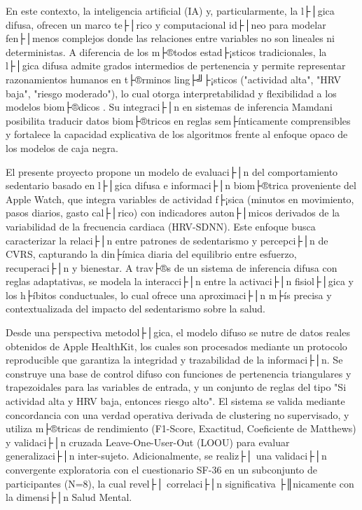 En este contexto, la inteligencia artificial (IA) y, particularmente, la l├│gica difusa, ofrecen un marco te├│rico y computacional id├│neo para modelar fen├│menos complejos donde las relaciones entre variables no son lineales ni deterministas. A diferencia de los m├®todos estad├¡sticos tradicionales, la l├│gica difusa admite grados intermedios de pertenencia y permite representar razonamientos humanos en t├®rminos ling├╝├¡sticos ("actividad alta", "HRV baja", "riesgo moderado"), lo cual otorga interpretabilidad y flexibilidad a los modelos biom├®dicos \cite{Zadeh1965,Ross2010,Kaur2022}. Su integraci├│n en sistemas de inferencia Mamdani posibilita traducir datos biom├®tricos en reglas sem├ínticamente comprensibles y fortalece la capacidad explicativa de los algoritmos frente al enfoque opaco de los modelos de caja negra.

El presente proyecto propone un modelo de evaluaci├│n del comportamiento sedentario basado en l├│gica difusa e informaci├│n biom├®trica proveniente del Apple Watch, que integra variables de actividad f├¡sica (minutos en movimiento, pasos diarios, gasto cal├│rico) con indicadores auton├│micos derivados de la variabilidad de la frecuencia cardiaca (HRV-SDNN). Este enfoque busca caracterizar la relaci├│n entre patrones de sedentarismo y percepci├│n de CVRS, capturando la din├ímica diaria del equilibrio entre esfuerzo, recuperaci├│n y bienestar. A trav├®s de un sistema de inferencia difusa con reglas adaptativas, se modela la interacci├│n entre la activaci├│n fisiol├│gica y los h├íbitos conductuales, lo cual ofrece una aproximaci├│n m├ís precisa y contextualizada del impacto del sedentarismo sobre la salud.

Desde una perspectiva metodol├│gica, el modelo difuso se nutre de datos reales obtenidos de Apple HealthKit, los cuales son procesados mediante un protocolo reproducible que garantiza la integridad y trazabilidad de la informaci├│n. Se construye una base de control difuso con funciones de pertenencia triangulares y trapezoidales para las variables de entrada, y un conjunto de reglas del tipo "Si actividad alta y HRV baja, entonces riesgo alto". El sistema se valida mediante concordancia con una verdad operativa derivada de clustering no supervisado, y utiliza m├®tricas de rendimiento (F1-Score, Exactitud, Coeficiente de Matthews) y validaci├│n cruzada Leave-One-User-Out (LOOU) para evaluar generalizaci├│n inter-sujeto. Adicionalmente, se realiz├│ una validaci├│n convergente exploratoria con el cuestionario SF-36 en un subconjunto de participantes (N=8), la cual revel├│ correlaci├│n significativa ├║nicamente con la dimensi├│n Salud Mental.

